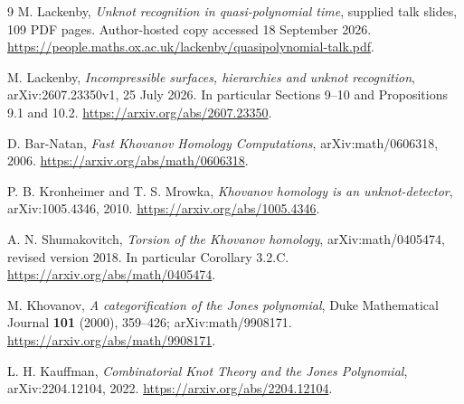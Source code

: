 \documentclass[11pt]{article}
\begin{document}
\begin{thebibliography}{9}
M. Lackenby, \emph{Unknot recognition in quasi-polynomial time}, supplied talk
slides, 109 PDF pages. Author-hosted copy accessed 18 September 2026.
\url{https://people.maths.ox.ac.uk/lackenby/quasipolynomial-talk.pdf}.

M. Lackenby, \emph{Incompressible surfaces, hierarchies and unknot recognition},
arXiv:2607.23350v1, 25 July 2026. In particular Sections 9--10 and
Propositions 9.1 and 10.2.
\url{https://arxiv.org/abs/2607.23350}.

D. Bar-Natan, \emph{Fast Khovanov Homology Computations},
arXiv:math/0606318, 2006.
\url{https://arxiv.org/abs/math/0606318}.

P. B. Kronheimer and T. S. Mrowka, \emph{Khovanov homology is an
unknot-detector}, arXiv:1005.4346, 2010.
\url{https://arxiv.org/abs/1005.4346}.

A. N. Shumakovitch, \emph{Torsion of the Khovanov homology},
arXiv:math/0405474, revised version 2018. In particular Corollary 3.2.C.
\url{https://arxiv.org/abs/math/0405474}.

M. Khovanov, \emph{A categorification of the Jones polynomial},
Duke Mathematical Journal \textbf{101} (2000), 359--426;
arXiv:math/9908171.
\url{https://arxiv.org/abs/math/9908171}.

L. H. Kauffman, \emph{Combinatorial Knot Theory and the Jones Polynomial},
arXiv:2204.12104, 2022.
\url{https://arxiv.org/abs/2204.12104}.
\end{thebibliography}
\end{document}
